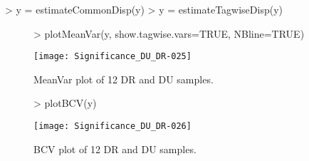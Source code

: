 \documentclass{article}
\begin{document}
\begin{Schunk}
\begin{Sinput}
> y = estimateCommonDisp(y)
> y = estimateTagwiseDisp(y)
\end{Sinput}
\end{Schunk}

\begin{figure}[H]
\centering
\begin{Schunk}
\begin{Sinput}
> plotMeanVar(y, show.tagwise.vars=TRUE, NBline=TRUE)
\end{Sinput}
\end{Schunk}
\texttt{[image: Significance\_DU\_DR-025]}
\caption{MeanVar plot of 12 DR and DU samples.}
\label{MDS}
\end{figure}

\begin{figure}[H]
\centering
\begin{Schunk}
\begin{Sinput}
> plotBCV(y)
\end{Sinput}
\end{Schunk}
\texttt{[image: Significance\_DU\_DR-026]}
\caption{BCV plot of 12 DR and DU samples.}
\label{MDS}
\end{figure}
\end{document}
